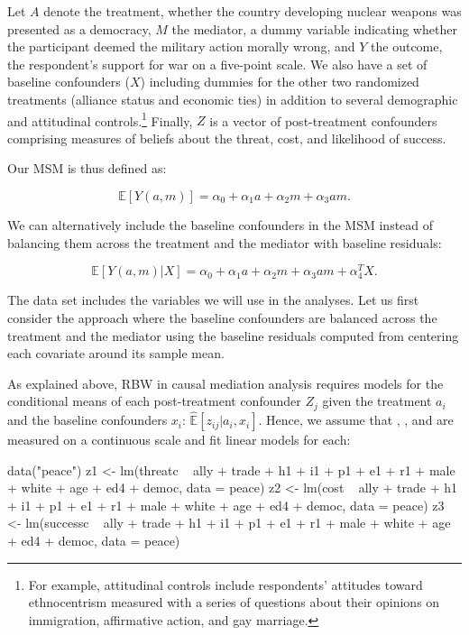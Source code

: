 Let \(A\) denote the treatment, whether the country developing nuclear
weapons was presented as a democracy, \(M\) the mediator, a dummy
variable indicating whether the participant deemed the military action
morally wrong, and \(Y\) the outcome, the respondent's support for war
on a five-point scale. We also have a set of baseline confounders
(\(X\)) including dummies for the other two randomized treatments
(alliance status and economic ties) in addition to several demographic
and attitudinal controls.\footnote{For example, attitudinal controls
  include respondents' attitudes toward ethnocentrism measured with a
  series of questions about their opinions on immigration, affirmative
  action, and gay marriage.} Finally, \(Z\) is a vector of
post-treatment confounders comprising measures of beliefs about the
threat, cost, and likelihood of success.

Our MSM is thus defined as:

\begin{equation}
\label{eq:13}
\mathbb{E}[Y(a, m)]=\alpha_{0}+\alpha_{1}a +\alpha_{2}m+\alpha_{3}am.
\end{equation}

We can alternatively include the baseline confounders in the MSM instead
of balancing them across the treatment and the mediator with baseline
residuals:

\begin{equation}
\label{eq:14}
\mathbb{E}[Y(a, m)|X]=\alpha_{0}+\alpha_{1}a +\alpha_{2}m+\alpha_{3}am + \alpha_{4}^{T}X.
\end{equation}

The  data set includes the variables we will use in the
analyses. Let us first consider the approach where the baseline
confounders are balanced across the treatment and the mediator using the
baseline residuals computed from centering each covariate around its
sample mean.

As explained above, RBW in causal mediation analysis requires models for
the conditional means of each post-treatment confounder \(Z_{j}\) given
the treatment \(a_{i}\) and the baseline confounders \(x_{i}\):
\(\hat{\mathbb{E}}[z_{ij}|a_{i},x_{i}]\). Hence, we assume that
, , and  are measured on a
continuous scale and fit linear models for each:

\begin{Schunk}
\begin{Sinput}
data("peace")
z1 <- lm(threatc ~ ally + trade + h1 + i1 + p1 + e1 + r1 +
           male + white + age + ed4 + democ,
         data = peace)
z2 <- lm(cost ~ ally + trade + h1 + i1 + p1 + e1 + r1 +
           male + white + age + ed4 + democ,
         data = peace)
z3 <- lm(successc ~ ally + trade + h1 + i1 + p1 + e1 + r1 +
           male + white + age + ed4 + democ,
         data = peace)
\end{Sinput}
\end{Schunk}

